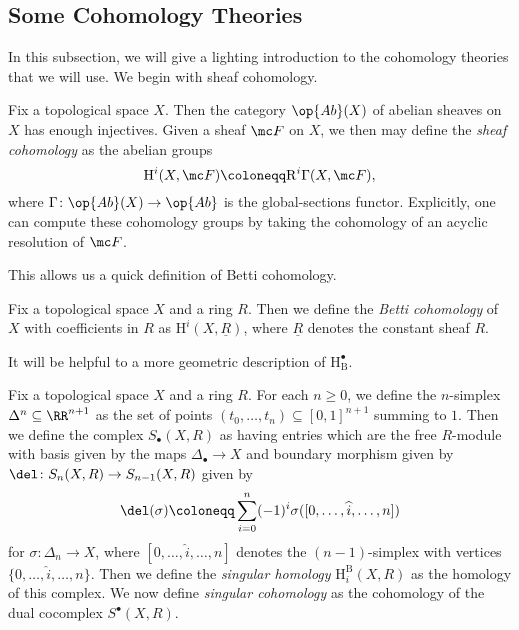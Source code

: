 \documentclass[../thesis.tex]{subfiles}
\begin{document}
\subsection{Some Cohomology Theories} \label{subsec:review-cohom}
In this subsection, we will give a lighting introduction to the cohomology theories that we will use. We begin with sheaf cohomology.
\begin{defihelper} 
	Fix a topological space $X$. Then the category $\op{Ab}(X)$ of abelian sheaves on $X$ has enough injectives. Given a sheaf $\mc F$ on $X$, we then may define the \textit{sheaf cohomology} as the abelian groups
	\[\mathrm H^i(X,\mc F)\coloneqq\mathrm R^i\Gamma(X,\mc F),\]
	where $\Gamma\colon\op{Ab}(X)\to\op{Ab}$ is the global-sections functor. Explicitly, one can compute these cohomology groups by taking the cohomology of an acyclic resolution of $\mc F$.
\end{defihelper}
This allows us a quick definition of Betti cohomology.
\begin{defihelper} 
	Fix a topological space $X$ and a ring $R$. Then we define the \textit{Betti cohomology} of $X$ with coefficients in $R$ as $\mathrm H^i(X,\underline R)$, where $\underline R$ denotes the constant sheaf $R$.
\end{defihelper}
It will be helpful to a more geometric description of $\mathrm H^\bullet_{\mathrm B}$.
\begin{defihelper}  
	Fix a topological space $X$ and a ring $R$. For each $n\ge0$, we define the $n$-simplex $\Delta^n\subseteq\RR^{n+1}$ as the set of points $(t_0,\ldots,t_n)\subseteq[0,1]^{n+1}$ summing to $1$. Then we define the complex $S_\bullet(X,R)$ as having entries which are the free $R$-module with basis given by the maps $\Delta_\bullet\to X$ and boundary morphism given by $\del\colon S_{n}(X,R)\to S_{n-1}(X,R)$ given by
	\[\del(\sigma)\coloneqq\sum_{i=0}^n(-1)^i\sigma([0,\ldots,\widehat i,\ldots,n])\]
	for $\sigma\colon\Delta_n\to X$, where $[0,\ldots,\widehat i,\ldots,n]$ denotes the $(n-1)$-simplex with vertices $\{0,\ldots,\widehat i,\ldots,n\}$. Then we define the \textit{singular homology} $\mathrm H^{\mathrm B}_i(X,R)$ as the homology of this complex. We now define \textit{singular cohomology} as the cohomology of the dual cocomplex $S^\bullet(X,R)$.
\end{defihelper}
\end{document}
